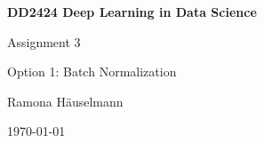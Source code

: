 \begin{titlepage}
\begin{center}
	\vspace{3em}	
    {\Huge\bfseries DD2424 Deep Learning in Data Science\par}
    \vspace{2em}
    {\huge Assignment 3 \par}
    \vspace{3em}
    {\huge Option 1: Batch Normalization \par}
    \vspace{3em}
    {\Large Ramona Häuselmann\par}
	\vspace{1em}
    \today
\end{center}
\end{titlepage}